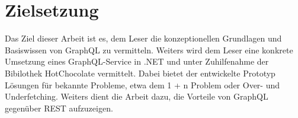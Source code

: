 \section{Zielsetzung}
Das Ziel dieser Arbeit ist es, dem Leser die konzeptionellen Grundlagen und Basiswissen von GraphQL zu vermitteln.
Weiters wird dem Leser eine konkrete Umsetzung eines GraphQL-Service in .NET und unter Zuhilfenahme der Bibilothek HotChocolate vermittelt.
Dabei bietet der entwickelte Prototyp Lösungen für bekannte Probleme, etwa dem 1 + n Problem oder Over- und Underfetching.
Weiters dient die Arbeit dazu, die Vorteile von GraphQL gegenüber REST aufzuzeigen.